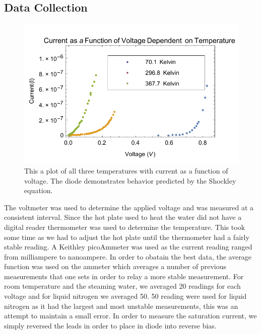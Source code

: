 \documentclass[11pt,letterpaper,onecolumn]{article}
\begin{document}
\subsection{Data Collection}
\begin{figure}[H]
 \begin{center}
 \includegraphics*[scale = .9]{TempComp.pdf}
 \caption{ This a plot of all three temperatures with current as a function of voltage. The diode demonstrates behavior predicted by the Shockley equation.~\label{fig:all3} }
 \end{center}
\end{figure}

The voltmeter was used to determine the applied voltage and was measured at a consistent interval. Since the hot plate used to heat the water did not have a digital reader thermometer was used to determine the temperature. This took some time as we had to adjust the hot plate until the thermometer had a fairly stable reading. A Keithley picoAmmeter was used as the current reading ranged from milliampere to nanoampere. In order to obatain the best data, the average function was used on the ammeter which averages a number of previous measurements that one sets in order to relay a more stable measurement. For room temperature and the steaming water, we averaged 20 readings for each voltage and for liquid nitrogen we averaged 50. 50 reading were used for liquid nitrogen as it had the largest and most unstable measurements, this was an attempt to maintain a small error. In order to measure the saturation current, we simply reversed the leads in order to place in diode into reverse bias. 
\end{document}
